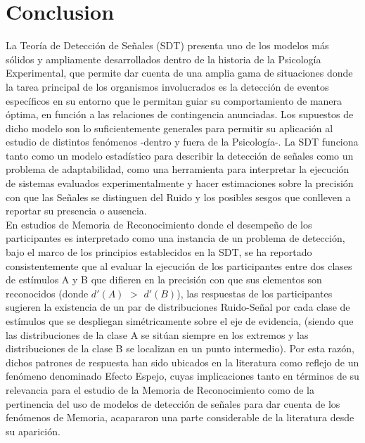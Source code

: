 \documentclass[jou,apacite]{apa6}
\begin{document}
\section{Conclusion}
La Teoría de Detección de Señales (SDT) presenta uno de los modelos más sólidos y ampliamente desarrollados dentro de la historia de la Psicología Experimental, que permite dar cuenta de una amplia gama de situaciones donde la tarea principal de los organismos involucrados es la detección de eventos específicos en su entorno que le permitan guiar su comportamiento de manera óptima, en función a las relaciones de contingencia anunciadas. Los supuestos de dicho modelo son lo suficientemente generales para permitir su aplicación al estudio de distintos fenómenos -dentro y fuera de la Psicología-. La SDT funciona tanto como un modelo estadístico para describir la detección de señales como un problema de adaptabilidad, como una herramienta para interpretar la ejecución de sistemas evaluados experimentalmente y hacer estimaciones sobre la precisión con que las Señales se distinguen del Ruido y los posibles sesgos que conlleven a reportar su presencia o ausencia.\\

En estudios de Memoria de Reconocimiento donde el desempeño de los participantes es interpretado como una instancia de un problema de detección, bajo el marco de los principios establecidos en la SDT, se ha reportado consistentemente que al evaluar la ejecución de los participantes entre dos clases de estímulos A y B que difieren en la precisión con que sus elementos son reconocidos (donde $d'(A)$ $>$ $d'(B)$), las respuestas de los participantes sugieren la existencia de un par de distribuciones Ruido-Señal por cada clase de estímulos que se despliegan simétricamente sobre el eje de evidencia, (siendo que las distribuciones de la clase A se sitúan siempre en los extremos y las distribuciones de la clase B se localizan en un punto intermedio). Por esta razón, dichos patrones de respuesta han sido ubicados en la literatura como reflejo de un fenómeno denominado Efecto Espejo, cuyas implicaciones tanto en términos de su relevancia para el estudio de la Memoria de Reconocimiento como de la pertinencia del uso de modelos de detección de señales para dar cuenta de los fenómenos de Memoria, acapararon una parte considerable de la literatura desde su aparición.\\
\end{document}
